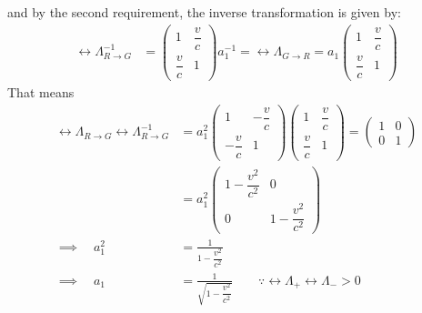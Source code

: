 and by the second requirement, the inverse transformation is given by:
\begin{align}
  \rel{\Lambda}_{R \to G}^{-1}
   & =\begin{pmatrix}
        1            & \dfrac{v}{c} \\[6pt]
        \dfrac{v}{c} & 1
      \end{pmatrix} a_1^{-1} = \rel{\Lambda}_{G \to R} = a_1 \begin{pmatrix}
                                                               1            & \dfrac{v}{c} \\[6pt]
                                                               \dfrac{v}{c} & 1
                                                             \end{pmatrix}
\end{align}
That means
\begin{align}
  \rel{\Lambda}_{R \to G} \rel{\Lambda}_{R \to G}^{-1}
                       & = a_1^2 \begin{pmatrix}
                                   1             & - \dfrac{v}{c} \\[6pt]
                                   -\dfrac{v}{c} & 1
                                 \end{pmatrix} \begin{pmatrix}
                                                 1            & \dfrac{v}{c} \\[6pt]
                                                 \dfrac{v}{c} & 1
                                               \end{pmatrix} = \begin{pmatrix}
                                                                 1 & 0 \\
                                                                 0 & 1
                                                               \end{pmatrix}                                    \\
                       & = a_1^2\begin{pmatrix}
                                  1 - \dfrac{v^2}{c^2} & 0                    \\[6pt]
                                  0                    & 1 - \dfrac{v^2}{c^2}
                                \end{pmatrix}                                   \\
  \implies \quad a_1^2 & = \frac{1}{1 - \dfrac{v^2}{c^2}}                                                            \\
  \implies \quad a_1   & = \frac{1}{\sqrt{1 - \dfrac{v^2}{c^2}}} \qquad \because \rel{\Lambda}_+ \rel{\Lambda}_- > 0
\end{align}
